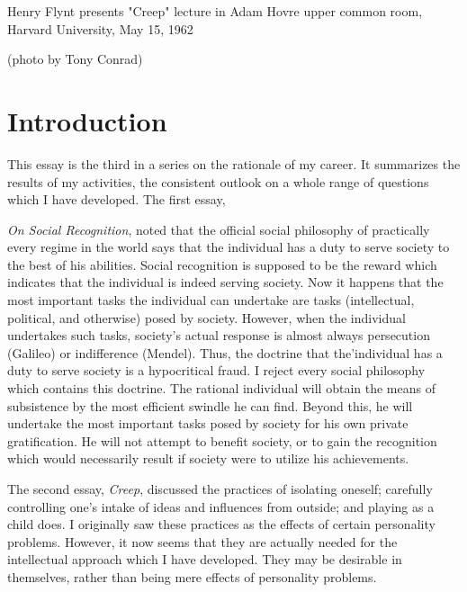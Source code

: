 \documentclass[10pt,twoside]{memoir}
\newcommand{\essaytitle}[1]{
	\emph{#1}}
\begin{document}
\graphicspath{{img/}}
\pagestyle{ruled}

{
\thispagestyle{empty}

Henry Flynt presents "Creep" lecture in Adam Hovre upper common room, Harvard 
University, May 15, 1962 


(photo by Tony Conrad) 
\clearpage
}

\tableofcontents*

\mainmatter

\chapter{Introduction}


This essay is the third in a series on the rationale of my career. It 
summarizes the results of my activities, the consistent outlook on a whole 
range of questions which I have developed. The first essay, 
\essaytitle{On Social Recognition}, noted that the official social philosophy of practically every 
regime in the world says that the individual has a duty to serve society to the 
best of his abilities. Social recognition is supposed to be the reward which 
indicates that the individual is indeed serving society. Now it happens that 
the most important tasks the individual can undertake are tasks (intellectual, 
political, and otherwise) posed by society. However, when the individual 
undertakes such tasks, society's actual response is almost always persecution 
(Galileo) or indifference (Mendel). Thus, the doctrine that the'individual has 
a duty to serve society is a hypocritical fraud. I reject every social 
philosophy which contains this doctrine. The rational individual will obtain 
the means of subsistence by the most efficient swindle he can find. Beyond 
this, he will undertake the most important tasks posed by society for his 
own private gratification. He will not attempt to benefit society, or to gain 
the recognition which would necessarily result if society were to utilize his 
achievements. 

The second essay, \essaytitle{Creep}, discussed the practices of isolating oneself; 
carefully controlling one's intake of ideas and influences from outside; and 
playing as a child does. I originally saw these practices as the effects of 
certain personality problems. However, it now seems that they are actually 
needed for the intellectual approach which I have developed. They may be 
desirable in themselves, rather than being mere effects of personality 
problems. 
\end{document}
